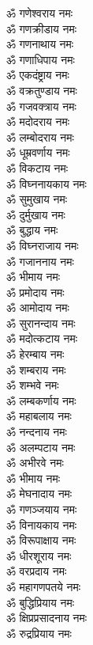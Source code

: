 \begin{multicols}{2}
\begin{flushleft}
ॐ गणेश्वराय नमः\\
ॐ गणक्रीडाय नमः\\
ॐ गणनाथाय नमः\\
ॐ गणाधिपाय नमः\\
ॐ एकदंष्ट्राय नमः\\
ॐ वक्रतुण्डाय नमः\\
ॐ गजवक्त्राय नमः\\
ॐ मदोदराय नमः\\
ॐ लम्बोदराय नमः\\
ॐ धूम्रवर्णाय नमः\hfill{}\\
ॐ विकटाय नमः\\
ॐ विघ्ननायकाय नमः\\
ॐ सुमुखाय नमः\\
ॐ दुर्मुखाय नमः\\
ॐ बुद्धाय नमः\\
ॐ विघ्नराजाय नमः\\
ॐ गजाननाय नमः\\
ॐ भीमाय नमः\\
ॐ प्रमोदाय नमः\\
ॐ आमोदाय नमः\hfill{}\\
ॐ सुरानन्दाय नमः\\
ॐ मदोत्कटाय नमः\\
ॐ हेरम्बाय नमः\\
ॐ शम्बराय नमः\\
ॐ शम्भवे नमः\\
ॐ लम्बकर्णाय नमः\\
ॐ महाबलाय नमः\\
ॐ नन्दनाय नमः\\
ॐ अलम्पटाय नमः\\
ॐ अभीरवे नमः\hfill{}\\
ॐ भीमाय नमः\\
ॐ मेघनादाय नमः\\
ॐ गणञ्जयाय नमः\\
ॐ विनायकाय नमः\\
ॐ विरूपाक्षाय नमः\\
ॐ धीरशूराय नमः\\
ॐ वरप्रदाय नमः\\
ॐ महागणपतये नमः\\
ॐ बुद्धिप्रियाय नमः\\
ॐ क्षिप्रप्रसादनाय नमः\hfill{}\\
ॐ रुद्रप्रियाय नमः\\

\end{flushleft}
\end{multicols}
